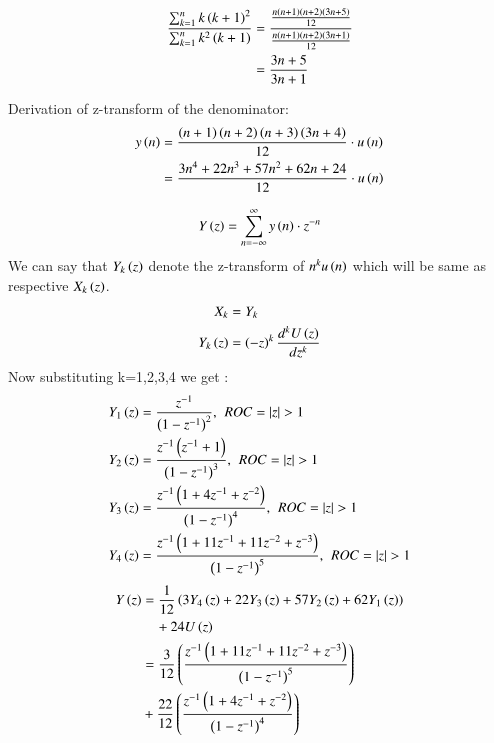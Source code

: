 \documentclass[journal,12pt,twocolumn]{IEEEtran}
\theoremstyle{remark}
\begin{document}
\begin{enumerate}[label=\arabic*.]
\begin{align}
     \dfrac{ \sum_{k=1}^n k\left(k+1\right)^2 }{\sum_{k=1}^n k^2\left(k+1\right)} &= \dfrac{\frac{n\left(n+1\right)\left(n+2\right)\left(3n+5\right)}{12}}{\frac{n\left(n+1\right)\left(n+2\right)\left(3n+1\right)}{12}}\\
                                                            &= \frac{3n+5}{3n+1}
\end{align}

Derivation of z-transform of the denominator:
\begin{align}
    y\left(n\right) &= \frac{\left(n+1\right)\left(n+2\right)\left(n+3\right)\left(3n+4\right)}{12}\cdot u\left(n\right)\\
         &= \frac{3n^4 + 22n^3 + 57n^2 + 62n + 24}{12}\cdot u\left(n\right) \label{eq:11.9.5.26.3}
\end{align}

\begin{equation}
    Y\left(z\right) = \sum_{n=-\infty}^\infty y\left(n\right)\cdot z^{-n}
\end{equation}
We can say that $Y_k\left(z\right)$ denote the z-transform of $n^{k}u\left(n\right)$ which will be same as respective $X_k\left(z\right)$.
\begin{align}\label{eq:61}
    X_k&=Y_k\\
    Y_k\left(z\right) &=  \left(-z\right)^k \frac{d^kU\left(z\right)}{dz^k}\label{eq:24}
\end{align}
Now substituting k=1,2,3,4 we get :
\begin{align}
    Y_1\brak{z} &= \frac{z^{-1}}{\brak{1-z^{-1}}^2} , \hspace{4pt} ROC=|z|>1\\
    Y_2\brak{z} &= \frac{z^{-1}\brak{z^{-1}+1}}{\brak{1-z^{-1}}^3} , \hspace{4pt} ROC=|z|>1\\
    Y_3\brak{z} &= \frac{z^{-1}\brak{1+4z^{-1}+z^{-2}}}{\brak{1-z^{-1}}^4}, \hspace{4pt} ROC=|z|>1\\
    Y_4\brak{z} &= \frac{z^{-1}\brak{1+11z^{-1}+11z^{-2}+z^{-3}}}{\brak{1-z^{-1}}^5}, \hspace{4pt} ROC=|z|>1
\end{align}
\begin{align}
    Y\brak{z} &=\frac{1}{12}\brak{3Y_4\brak{z} + 22Y_3\brak{z} + 57Y_2\brak{z} + 62Y_1\brak{z}} \\ 
&\quad + 24U\brak{z} \notag  \\
         &= \frac{3}{12}\left(\frac{z^{-1}\brak{1+11z^{-1}+11z^{-2}+z^{-3}}}{\brak{1-z^{-1}}^5}\right)\\ &+ \frac{22}{12}\left(\frac{z^{-1}\brak{1+4z^{-1}+z^{-2}}}{\brak{1-z^{-1}}^4}\right) 

\end{align}
\end{enumerate}
\end{document}
